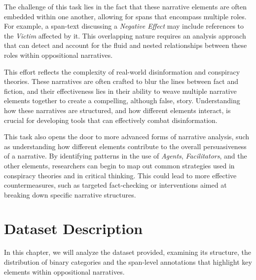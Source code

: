 \documentclass{Configuration_Files/PoliMi3i_thesis}
\begin{document}
The challenge of this task lies in the fact that these narrative elements are often embedded within one another, allowing for spans that encompass multiple roles. For example, a span-text discussing a \textit{Negative Effect} may include references to the \textit{Victim} affected by it. This overlapping nature requires an analysis approach that can detect and account for the fluid and nested relationships between these roles within oppositional narratives.

This effort reflects the complexity of real-world disinformation and conspiracy theories. These narratives are often crafted to blur the lines between fact and fiction, and their effectiveness lies in their ability to weave multiple narrative elements together to create a compelling, although false, story. Understanding how these narratives are structured, and how different elements interact, is crucial for developing tools that can effectively combat disinformation.

This task also opens the door to more advanced forms of narrative analysis, such as understanding how different elements contribute to the overall persuasiveness of a narrative. By identifying patterns in the use of \textit{Agents}, \textit{Facilitators}, and the other elements, researchers can begin to map out common strategies used in conspiracy theories and in critical thinking. This could lead to more effective countermeasures, such as targeted fact-checking or interventions aimed at breaking down specific narrative structures.

\chapter{Dataset Description}  \label{chap:dataset_description}
In this chapter, we will analyze the dataset provided, examining its structure, the distribution of binary categories and the span-level annotations that highlight key elements within oppositional narratives.
\end{document}
